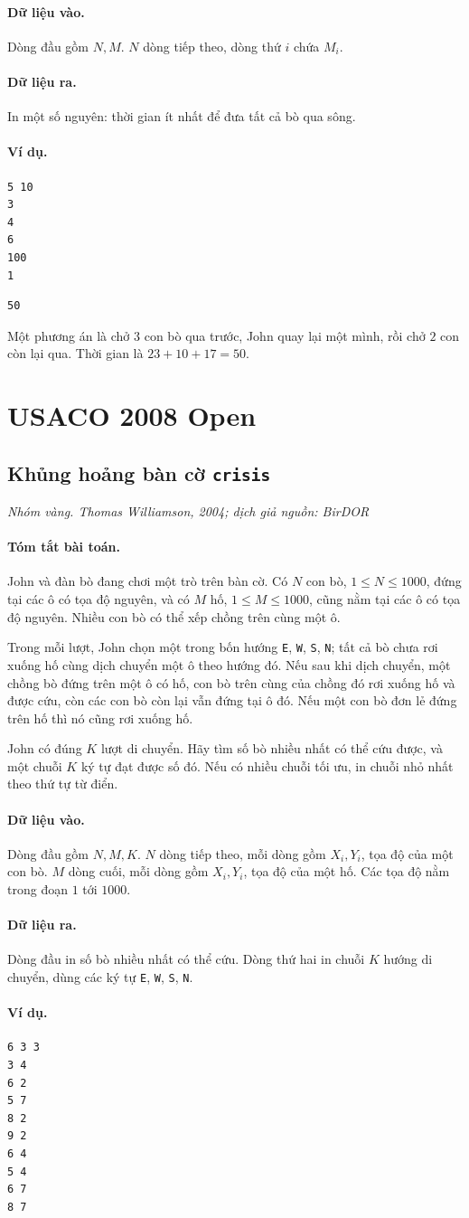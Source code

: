 \documentclass[11pt]{article}
\newcommand{\problem}[4]{%
  \subsection[#1 (#2)]{#1 \hfill {\normalsize\texttt{#2}}}%
  \noindent\textit{#3. #4}\par\smallskip
}
\newcommand{\iosec}[1]{\paragraph{#1}}
\begin{document}
\iosec{Dữ liệu vào.}
Dòng đầu gồm \(N,M\). \(N\) dòng tiếp theo, dòng thứ \(i\) chứa \(M_i\).

\iosec{Dữ liệu ra.}
In một số nguyên: thời gian ít nhất để đưa tất cả bò qua sông.

\iosec{Ví dụ.}
\begin{verbatim}
5 10
3
4
6
100
1
\end{verbatim}

\begin{verbatim}
50
\end{verbatim}

Một phương án là chở \(3\) con bò qua trước, John quay lại một mình, rồi chở
\(2\) con còn lại qua. Thời gian là \(23+10+17=50\).

\section{USACO 2008 Open}

\problem{Khủng hoảng bàn cờ}{crisis}{Nhóm vàng}{Thomas Williamson, 2004; dịch giả nguồn: BirDOR}

\iosec{Tóm tắt bài toán.}
John và đàn bò đang chơi một trò trên bàn cờ. Có \(N\) con bò,
\(1\le N\le 1000\), đứng tại các ô có tọa độ nguyên, và có \(M\) hố,
\(1\le M\le 1000\), cũng nằm tại các ô có tọa độ nguyên. Nhiều con bò có thể
xếp chồng trên cùng một ô.

Trong mỗi lượt, John chọn một trong bốn hướng \texttt{E}, \texttt{W},
\texttt{S}, \texttt{N}; tất cả bò chưa rơi xuống hố cùng dịch chuyển một ô
theo hướng đó. Nếu sau khi dịch chuyển, một chồng bò đứng trên một ô có hố,
con bò trên cùng của chồng đó rơi xuống hố và được cứu, còn các con bò còn
lại vẫn đứng tại ô đó. Nếu một con bò đơn lẻ đứng trên hố thì nó cũng rơi
xuống hố.

John có đúng \(K\) lượt di chuyển. Hãy tìm số bò nhiều nhất có thể cứu được,
và một chuỗi \(K\) ký tự đạt được số đó. Nếu có nhiều chuỗi tối ưu, in chuỗi
nhỏ nhất theo thứ tự từ điển.

\iosec{Dữ liệu vào.}
Dòng đầu gồm \(N,M,K\). \(N\) dòng tiếp theo, mỗi dòng gồm \(X_i,Y_i\), tọa
độ của một con bò. \(M\) dòng cuối, mỗi dòng gồm \(X_i,Y_i\), tọa độ của một
hố. Các tọa độ nằm trong đoạn \(1\) tới \(1000\).

\iosec{Dữ liệu ra.}
Dòng đầu in số bò nhiều nhất có thể cứu. Dòng thứ hai in chuỗi \(K\) hướng di
chuyển, dùng các ký tự \texttt{E}, \texttt{W}, \texttt{S}, \texttt{N}.

\iosec{Ví dụ.}
\begin{verbatim}
6 3 3
3 4
6 2
5 7
8 2
9 2
6 4
5 4
6 7
8 7
\end{verbatim}
\end{document}
